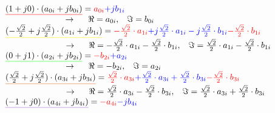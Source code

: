 $\mathunderline{red}{(1+j0) \cdot (a_{0i}+jb_{0i})} = \textcolor{red}{a_{0i}}\textcolor{blue}{+jb_{1i}}$\\

$\hspace{2.5cm}\rightarrow \hspace{0.5cm} \Re=a_{0i}, \hspace{0.3cm}\Im=b_{0i}$\\

$\mathunderline{yellow}{(-\frac{\sqrt{2}}{2}+j\frac{\sqrt{2}}{2}) \cdot (a_{1i}+jb_{1i})} = \textcolor{red}{-\frac{\sqrt{2}}{2} \cdot a_{1i}} \textcolor{blue}{+j\frac{\sqrt{2}}{2} \cdot a_{1i} -j\frac{\sqrt{2}}{2} \cdot b_{1i}} \textcolor{red}{-\frac{\sqrt{2}}{2} \cdot b_{1i}}$\\

$\hspace{2.5cm}\rightarrow \hspace{0.5cm} \Re=-\frac{\sqrt{2}}{2} \cdot a_{1i} -\frac{\sqrt{2}}{2} \cdot b_{1i}, \hspace{0.3cm} \Im=\frac{\sqrt{2}}{2} \cdot a_{1i} - \frac{\sqrt{2}}{2} \cdot b_{1i}$\\

$\mathunderline{green}{(0+j1) \cdot (a_{2i}+jb_{2i})} = \textcolor{red}{-b_{2i}}\textcolor{blue}{+a_{2i}}$\\

$\hspace{2.5cm}\rightarrow \hspace{0.5cm} \Re=-b_{2i}, \hspace{0.3cm}\Im=a_{2i}$\\

$\mathunderline{cinnamon}{(\frac{\sqrt{2}}{2}+j\frac{\sqrt{2}}{2}) \cdot (a_{3i}+jb_{3i})} = \textcolor{red}{\frac{\sqrt{2}}{2} \cdot a_{3i}}\textcolor{blue}{+\frac{\sqrt{2}}{2}\cdot a_{3i} + \frac{\sqrt{2}}{2} \cdot b_{3i}} \textcolor{red}{-\frac{\sqrt{2}}{2} \cdot b_{3i}}$\\

$\hspace{2.5cm}\rightarrow \hspace{0.5cm} \Re=\frac{\sqrt{2}}{2} \cdot a_{3i} -\frac{\sqrt{2}}{2} \cdot b_{3i}, \hspace{0.3cm} \Im=\frac{\sqrt{2}}{2} \cdot a_{3i} + \frac{\sqrt{2}}{2} \cdot b_{3i}$\\

$\mathunderline{lila}{(-1+j0) \cdot (a_{4i}+jb_{4i})} = \textcolor{red}{-a_{4i}}\textcolor{blue}{-jb_{4i}}$\\

